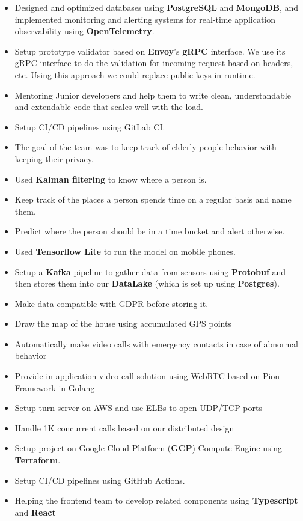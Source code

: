 \begin{itemize}
      \item Designed and optimized databases using \textbf{PostgreSQL} and \textbf{MongoDB},
            and implemented monitoring and alerting systems for real-time application observability using \textbf{OpenTelemetry}.
      \item Setup prototype validator based on \textbf{Envoy}'s \textbf{gRPC} interface. We use its gRPC interface to do the validation for incoming request
            based on headers, etc. Using this approach we could replace public keys in runtime.
      \item Mentoring Junior developers and help them to write clean, understandable and extendable code that scales well with the load.
      \item Setup CI/CD pipelines using GitLab CI.
\end{itemize}

\vspace{0.5cm}

\begin{itemize}
      \item The goal of the team was to keep track of elderly people behavior with keeping their privacy.
      \item Used \textbf{Kalman filtering} to know where a person is.
      \item Keep track of the places a person spends time on a regular basis and name them.
      \item Predict where the person should be in a time bucket and alert otherwise.
      \item Used \textbf{Tensorflow Lite} to run the model on mobile phones.
      \item Setup a \textbf{Kafka} pipeline to gather data from sensors using \textbf{Protobuf} and
            then stores them into our \textbf{DataLake} (which is set up using \textbf{Postgres}).
      \item Make data compatible with GDPR before storing it.
      \item Draw the map of the house using accumulated GPS points
      \item Automatically make video calls with emergency contacts in case of abnormal behavior
      \item Provide in-application video call solution using WebRTC based on Pion Framework in Golang
      \item Setup turn server on AWS and use ELBs to open UDP/TCP ports
      \item Handle 1K concurrent calls based on our distributed design
      \item Setup project on Google Cloud Platform (\textbf{GCP}) Compute Engine using \textbf{Terraform}.
      \item Setup CI/CD pipelines using GitHub Actions.
      \item Helping the frontend team to develop related components using \textbf{Typescript} and \textbf{React}
\end{itemize}
